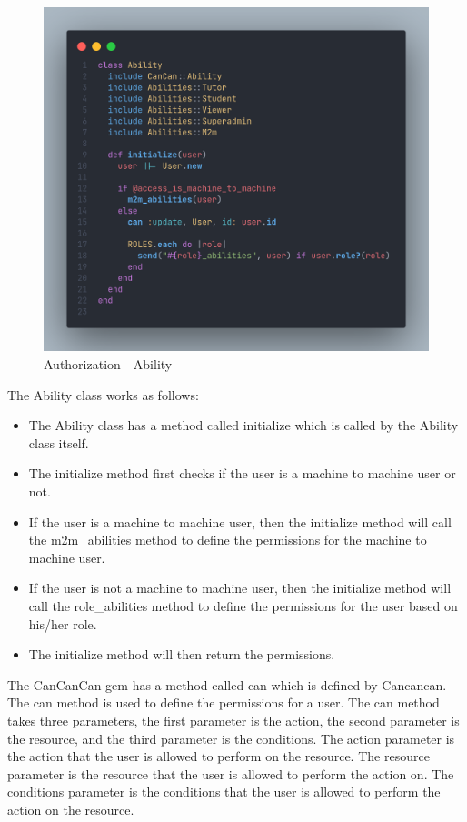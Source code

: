 \begin{justify}
        \begin{figure}[H]
            \centerline{\includegraphics[width=150mm,scale=1]{figures/implementation_and_testing/implementation/backend/Ability.png}}
            \caption{Authorization - Ability}
        \end{figure}

        \newendline The Ability class works as follows:

            \begin{itemize}
                \item The Ability class has a method called initialize which is called by the Ability class itself.
                \item The initialize method first checks if the user is a machine to machine user or not.
                \item If the user is a machine to machine user, then the initialize method will call the m2m\_abilities method to define the permissions for the machine to machine user.
                \item If the user is not a machine to machine user, then the initialize method will call the role\_abilities method to define the permissions for the user based on his/her role.
                \item The initialize method will then return the permissions.
            \end{itemize}


        \vspace{0.25cm}
        \newendline The CanCanCan gem has a method called can which is defined by Cancancan. The can method is used to define the permissions for a user. The can method takes three parameters, the first parameter is the action, the second parameter is the resource, and the third parameter is the conditions. The action parameter is the action that the user is allowed to perform on the resource. The resource parameter is the resource that the user is allowed to perform the action on. The conditions parameter is the conditions that the user is allowed to perform the action on the resource.


\end{justify}
